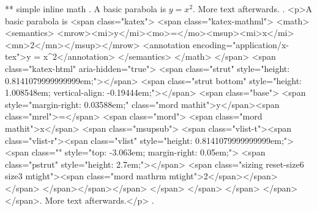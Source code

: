 ** simple inline math
.
A basic parabola is $y = x^2$. More text afterwards.
.
<p>A basic parabola is <span class="katex">
<span class="katex-mathml">
<math>
<semantics>
<mrow><mi>y</mi><mo>=</mo><msup><mi>x</mi><mn>2</mn></msup></mrow>
<annotation encoding="application/x-tex">y = x^2</annotation>
</semantics>
</math>
</span>
<span class="katex-html" aria-hidden="true">
<span class="strut" style="height: 0.8141079999999999em;"></span>
<span class="strut bottom" style="height: 1.008548em; vertical-align: -0.19444em;"></span>
<span class="base">
<span style="margin-right: 0.03588em;" class="mord mathit">y</span><span class="mrel">=</span>
<span class="mord">
<span class="mord mathit">x</span>
<span class="msupsub">
<span class="vlist-t"><span class="vlist-r"><span class="vlist" style="height: 0.8141079999999999em;">
<span class="" style="top: -3.063em; margin-right: 0.05em;">
<span class="pstrut" style="height: 2.7em;"></span>
<span class="sizing reset-size6 size3 mtight"><span class="mord mathrm mtight">2</span></span>
</span>
</span></span></span>
</span>
</span>
</span>
</span>
</span>. More text afterwards.</p>
.

